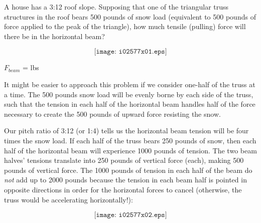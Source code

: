 

A house has a 3:12 roof slope.  Supposing that one of the triangular truss structures in the roof bears 500 pounds of snow load (equivalent to 500 pounds of force applied to the peak of the triangle), how much tensile (pulling) force will there be in the horizontal beam?

$$\texttt{[image: i02577x01.eps]}$$

$F_{beam}$ = \underbar{\hskip 50pt} lbs

\vskip 10pt







It might be easier to approach this problem if we consider one-half of the truss at a time.  The 500 pounds snow load will be evenly borne by each side of the truss, such that the tension in each half of the horizontal beam handles half of the force necessary to create the 500 pounds of upward force resisting the snow.  

Our pitch ratio of 3:12 (or 1:4) tells us the horizontal beam tension will be four times the snow load.  If each half of the truss bears 250 pounds of snow, then each half of the horizontal beam will experience 1000 pounds of tension.  The two beam halves' tensions translate into 250 pounds of vertical force (each), making 500 pounds of vertical force.  The 1000 pounds of tension in each half of the beam do {\it not} add up to 2000 pounds because the tension in each beam half is pointed in opposite directions in order for the horizontal forces to cancel (otherwise, the truss would be accelerating horizontally!):

$$\texttt{[image: i02577x02.eps]}$$











